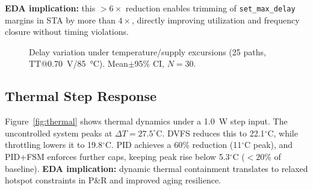 \documentclass[conference]{IEEEtran}
\begin{document}
\textbf{EDA implication:} this $>6\times$ reduction enables trimming of \texttt{set\_max\_delay} margins in STA by more than $4\times$, directly improving utilization and frequency closure without timing violations.

\begin{figure}[t]
\centering
{}
\caption{Delay variation under temperature/supply excursions (25 paths, TT@\SI{0.70}{V}/\SI{85}{\celsius}). Mean$\pm$95\% CI, $N=30$.}
\label{fig:rc}
\end{figure}

\subsection{Thermal Step Response}
Figure~\ref{fig:thermal} shows thermal dynamics under a \SI{1.0}{W} step input.  
The uncontrolled system peaks at $\Delta T=27.5^{\circ}$C. DVFS reduces this to 22.1$^{\circ}$C, while throttling lowers it to 19.8$^{\circ}$C. PID achieves a 60\% reduction (11$^{\circ}$C peak), and PID+FSM enforces further caps, keeping peak rise below 5.3$^{\circ}$C ($<20\%$ of baseline).  
\textbf{EDA implication:} dynamic thermal containment translates to relaxed hotspot constraints in P\&R and improved aging resilience.
\end{document}
